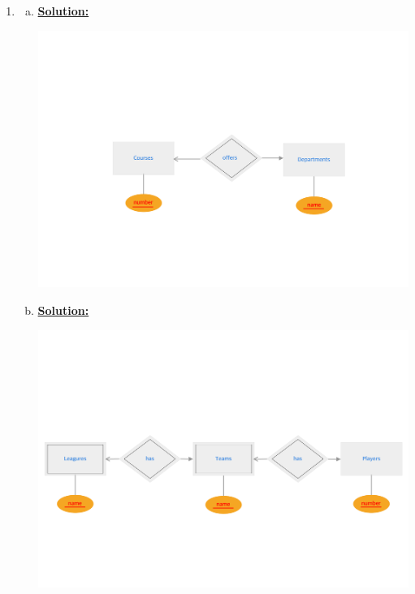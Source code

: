 \documentclass[12pt]{article}
\begin{document}
\begin{enumerate}[1.]
\begin{enumerate}[a)]
\begin{mdframed}
        \end{mdframed}

    \end{enumerate}


    \item

    \begin{enumerate}[a)]

        \item

        \underline{\textbf{Solution:}}

        \bigskip

        \begin{center}
        \includegraphics[width=\linewidth]{images/worksheet_14_solution_67.png}
        \end{center}

        \item

        \underline{\textbf{Solution:}}

        \bigskip

        \begin{center}
        \includegraphics[width=\linewidth]{images/worksheet_14_solution_68.png}
        \end{center}


\end{enumerate}
\end{enumerate}
\end{document}
